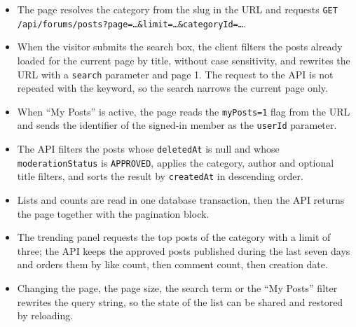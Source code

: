\begin{itemize}[leftmargin=1.6em,topsep=3pt,itemsep=2pt,parsep=0pt,label=$\bullet$]
      \item The page resolves the category from the slug in the URL and requests
            \texttt{GET /api/forums/posts?page=\ldots\&limit=\ldots\&categoryId=\ldots}.
      \item When the visitor submits the search box, the client filters the posts already
            loaded for the current page by title, without case sensitivity, and rewrites
            the URL with a \texttt{search} parameter and page 1. The request to the API is
            not repeated with the keyword, so the search narrows the current page only.
      \item When ``My Posts'' is active, the page reads the \texttt{myPosts=1} flag from
            the URL and sends the identifier of the signed-in member as the \texttt{userId}
            parameter.
      \item The API filters the posts whose \texttt{deletedAt} is null and whose
            \texttt{moderationStatus} is \texttt{APPROVED}, applies the category, author
            and optional title filters, and sorts the result by \texttt{createdAt} in
            descending order.
      \item Lists and counts are read in one database transaction, then the API returns the
            page together with the pagination block.
      \item The trending panel requests the top posts of the category with a limit of
            three; the API keeps the approved posts published during the last seven days
            and orders them by like count, then comment count, then creation date.
      \item Changing the page, the page size, the search term or the ``My Posts'' filter
            rewrites the query string, so the state of the list can be shared and restored
            by reloading.
\end{itemize}

